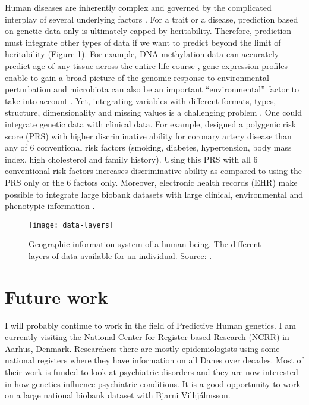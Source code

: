 Human diseases are inherently complex and governed by the complicated interplay of several underlying factors \cite[]{dey2013integration}.
For a trait or a disease, prediction based on genetic data only is ultimately capped by heritability.
Therefore, prediction must integrate other types of data if we want to predict beyond the limit of heritability (Figure \ref{fig:data-layers}).
For example, DNA methylation data can accurately predict age of any tissue across the entire life course \cite[]{horvath2013dna,horvath2018dna}, gene expression profiles enable to gain a broad picture of the genomic response to environmental perturbation \cite[]{gibson2008environmental} and microbiota can also be an important ``environmental'' factor to take into account \cite[]{backhed2004gut}. 
Yet, integrating variables with different formats, types, structure, dimensionality and missing values is a challenging problem \cite[]{dey2013integration}.
One could integrate genetic data with clinical data. For example, \cite{inouye2018genomic} designed a polygenic risk score (PRS) with higher discriminative ability for coronary artery disease than any of 6 conventional risk factors (smoking, diabetes, hypertension, body mass index, high cholesterol and family history).
Using this PRS with all 6 conventional risk factors increases discriminative ability as compared to using the PRS only or the 6 factors only.
Moreover, electronic health records (EHR) make possible to integrate large biobank datasets with large clinical, environmental and phenotypic information \cite[]{roden2016integrating}.

\begin{figure}[htpb]
\centerline{\texttt{[image: data-layers]}}
\caption{Geographic information system of a human being. The different layers of data available for an individual. Source: \cite{topol2014individualized}.}
\label{fig:data-layers}
\end{figure}


\section{Future work}

I will probably continue to work in the field of Predictive Human genetics. I am currently visiting the National Center for Register-based Research (NCRR) in Aarhus, Denmark. Researchers there are mostly epidemiologists using some national registers where they have information on all Danes over decades. Most of their work is funded to look at psychiatric disorders and they are now interested in how genetics influence psychiatric conditions. It is a good opportunity to work on a large national biobank dataset with Bjarni Vilhj\'almsson.

